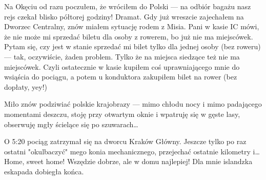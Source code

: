 Na Okęciu od razu poczułem, że wróciłem do Polski --- na odbiór bagażu nasz rejs czekał blisko półtorej godziny! Dramat. Gdy już wreszcie zajechałem na Dworzec Centralny, znów miałem sytuację rodem z Misia. Pani w kasie IC mówi, że nie może mi sprzedać biletu dla osoby z rowerem, bo już nie ma miejscówek. Pytam się, czy jest w stanie sprzedać mi bilet tylko dla jednej osoby (bez roweru) --- tak, oczywiście, żaden problem. Tylko że na miejsca siedzące też nie ma miejscówek. Czyli ostatecznie w kasie kupiłem coś uprawniającego mnie do wsiąścia do pociągu, a potem u konduktora zakupiłem bilet na rower (bez dopłaty, yey!)

Miło znów podziwiać polskie krajobrazy --- mimo chłodu nocy i mimo padającego momentami deszczu, stoję przy otwartym oknie i wpatruję się w gęste lasy, obserwuję mgły ścielące się po szuwarach…

O 5:20 pociąg zatrzymał się na dworcu Kraków Główny. Jeszcze tylko po raz ostatni "okulbaczyć" mego konia mechanicznego, przejechać ostatnie kilometry i… Home, sweet home! Wszędzie dobrze, ale w domu najlepiej! Dla mnie islandzka eskapada dobiegła końca.

